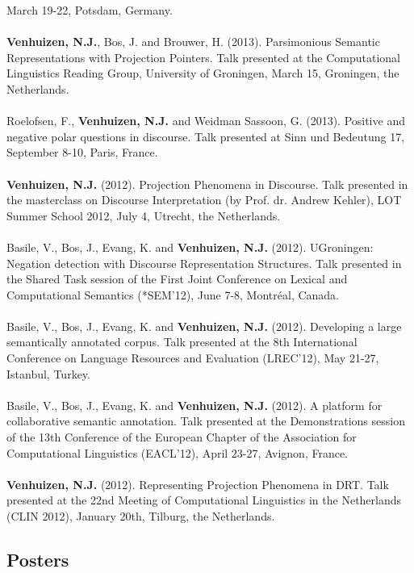 \documentclass[a4paper,10pt]{article}
\begin{document}
    March 19-22, Potsdam, Germany.\\
    \\
    \textbf{Venhuizen, N.J.}, Bos, J. and Brouwer, H. (2013). Parsimonious 
    Semantic Representations with Projection Pointers. Talk presented at the
    Computational Linguistics Reading Group, University of Groningen, March 15,
    Groningen, the Netherlands.\\
    \\
    Roelofsen, F., \textbf{Venhuizen, N.J.} and Weidman Sassoon, G. (2013).
    Positive and negative polar questions in discourse. Talk presented at
    Sinn und Bedeutung 17, September 8-10, Paris, France.\\
    \\
    \textbf{Venhuizen, N.J.} (2012). Projection Phenomena in Discourse. Talk
    presented in the masterclass on Discourse Interpretation (by Prof. dr.
    Andrew Kehler), LOT Summer School 2012, July 4, Utrecht, the Netherlands.\\
    \\
    Basile, V., Bos, J., Evang, K. and \textbf{Venhuizen, N.J.} (2012).
    UGroningen: Negation detection with Discourse Representation Structures.
    Talk presented in the Shared Task session of the First Joint Conference
    on Lexical and Computational Semantics (*SEM'12), June 7-8, Montr{\'e}al,
    Canada.\\
    \\
    Basile, V., Bos, J., Evang, K. and \textbf{Venhuizen, N.J.} (2012).
    Developing a large semantically annotated corpus. Talk presented at the
    8th International Conference on Language Resources and Evaluation
    (LREC'12), May 21-27, Istanbul, Turkey.\\
    \\
    Basile, V., Bos, J., Evang, K. and \textbf{Venhuizen, N.J.} (2012).
    A platform for collaborative semantic annotation. Talk presented at the
    Demonstrations session of the 13th Conference of the European Chapter of
    the Association for Computational Linguistics (EACL'12), April 23-27,
    Avignon, France.\\
    \\
    \textbf{Venhuizen, N.J.} (2012). Representing Projection Phenomena in
    DRT. Talk presented at the 22nd Meeting of Computational Linguistics in
    the Netherlands (CLIN 2012), January 20th, Tilburg, the Netherlands.

\subsection*{Posters}
\end{document}
